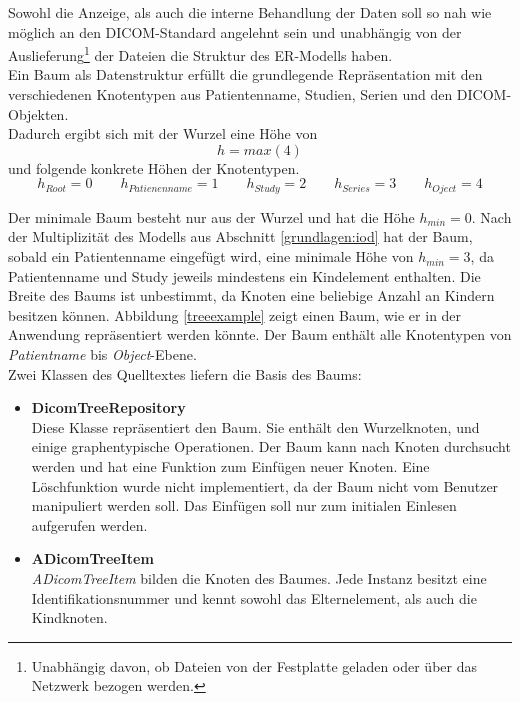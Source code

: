 Sowohl die Anzeige, als auch die interne Behandlung der Daten soll so nah wie möglich an den DICOM-Standard angelehnt sein und unabhängig von der Auslieferung\footnote{Unabhängig davon, ob Dateien von der Festplatte geladen oder über das Netzwerk bezogen werden.} der Dateien die Struktur des ER-Modells haben.\\
Ein Baum als Datenstruktur erfüllt die grundlegende Repräsentation mit den verschiedenen Knotentypen aus Patientenname, Studien, Serien und den DICOM-Objekten.\\
Dadurch ergibt sich mit der Wurzel eine Höhe von
\begin{equation}
h = max(4)
\label{baumheight}
\end{equation}
und folgende konkrete Höhen der Knotentypen.
\begin{equation}
h_{Root} = 0 \qquad
h_{Patienenname} = 1 \qquad 
h_{Study} = 2 \qquad
h_{Series} = 3 \qquad
h_{Oject} = 4
\label{heights}
\end{equation}

Der minimale Baum besteht nur aus der Wurzel und hat die Höhe $h_{min} = 0$. Nach der Multiplizität des Modells aus Abschnitt \ref{grundlagen:iod} hat der Baum, sobald ein Patientenname eingefügt wird, eine minimale Höhe von $h_{min} = 3$, da Patientenname und Study jeweils mindestens ein Kindelement enthalten. Die Breite des Baums ist unbestimmt, da Knoten eine beliebige Anzahl an Kindern besitzen können. Abbildung \ref{treeexample} zeigt einen Baum, wie er in der Anwendung repräsentiert werden könnte. Der Baum enthält alle Knotentypen von \textit{Patientname} bis \textit{Object}-Ebene.\\
Zwei Klassen des Quelltextes liefern die Basis des Baums:

\begin{itemize}
\item \textbf{DicomTreeRepository}\\
	  Diese Klasse repräsentiert den Baum. Sie enthält den Wurzelknoten, und einige graphentypische Operationen. Der Baum kann nach Knoten durchsucht werden und hat eine Funktion zum Einfügen neuer Knoten. Eine Löschfunktion wurde nicht implementiert, da der Baum nicht vom Benutzer manipuliert werden soll. Das Einfügen soll nur zum initialen Einlesen aufgerufen werden.
\item \textbf{ADicomTreeItem}\\
	  \textit{ADicomTreeItem} bilden die Knoten des Baumes. Jede Instanz besitzt eine Identifikationsnummer und kennt sowohl das Elternelement, als auch die Kindknoten. 
\end{itemize}

